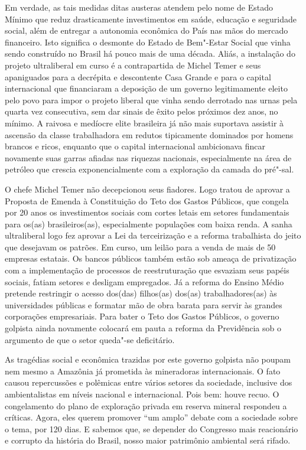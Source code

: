 Em verdade, as tais medidas ditas austeras atendem pelo nome de Estado
Mínimo que reduz drasticamente investimentos em saúde, educação e
seguridade social, além de entregar a autonomia econômica do País nas
mãos do mercado financeiro. Isto significa o desmonte do Estado de
Bem"-Estar Social que vinha sendo construído no Brasil há pouco mais de
uma década. Aliás, a instalação do projeto ultraliberal em curso é a
contrapartida de Michel Temer e seus apaniguados para a decrépita e
descontente Casa Grande e para o capital internacional que financiaram a
deposição de um governo legitimamente eleito pelo povo para impor o
projeto liberal que vinha sendo derrotado nas urnas pela quarta vez
consecutiva, sem dar sinais de êxito pelos próximos dez anos, no mínimo.
A raivosa e medíocre elite brasileira já não mais suportava assistir à
ascensão da classe trabalhadora em redutos tipicamente dominados por
homens brancos e ricos, enquanto que o capital internacional ambicionava
fincar novamente suas garras afiadas nas riquezas nacionais,
especialmente na área de petróleo que crescia exponencialmente com a
exploração da camada do pré"-sal.

O chefe Michel Temer não decepcionou seus fiadores. Logo tratou de
aprovar a Proposta de Emenda à Constituição do Teto dos Gastos Públicos,
que congela por 20 anos os investimentos sociais com cortes letais em
setores fundamentais para os(as) brasileiros(as), especialmente
populações com baixa renda. A sanha ultraliberal logo fez aprovar a Lei
da terceirização e a reforma trabalhista do jeito que desejavam os
patrões. Em curso, um leilão para a venda de mais de 50 empresas
estatais. Os bancos públicos também estão sob ameaça de privatização
com a implementação de processos de reestruturação que esvaziam seus
papéis sociais, fatiam setores e desligam empregados. Já a reforma do
Ensino Médio pretende restringir o acesso dos(das) filhos(as) dos(as)
trabalhadores(as) às universidades públicas e formatar mão de obra
barata para servir às grandes corporações empresariais. Para bater o
Teto dos Gastos Públicos, o governo golpista ainda novamente colocará em
pauta a reforma da Previdência sob o argumento de que o setor queda"-se
deficitário.

As tragédias social e econômica trazidas por este governo golpista não
poupam nem mesmo a Amazônia já prometida às mineradoras internacionais.
O fato causou repercussões e polêmicas entre vários setores da
sociedade, inclusive dos ambientalistas em níveis nacional e
internacional. Pois bem: houve recuo. O congelamento do plano de
exploração privada em reserva mineral respondeu a críticas. Agora, eles
querem promover ``um amplo'' debate com a sociedade sobre o tema, por 120
dias. E sabemos que, se depender do Congresso mais reacionário e
corrupto da história do Brasil, nosso maior patrimônio ambiental será
rifado.

